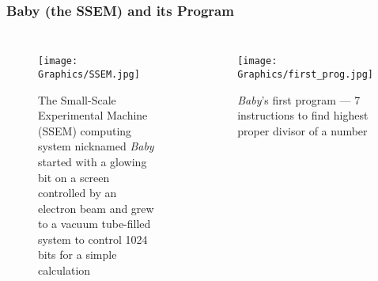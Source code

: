 \begin{frame}
  \frametitle{Baby (the SSEM) and its Program}
  \begin{columns}
    \begin{figure}
      \centering
      \texttt{[image: Graphics/SSEM.jpg]}
      \caption{The Small-Scale Experimental Machine (SSEM) computing system nicknamed \emph{Baby} started with a glowing bit on a screen controlled by an electron beam and grew to a vacuum tube-filled system to control \num{1024} bits for a simple calculation}
      \label{fig:Baby}
    \end{figure}

    \begin{figure}
      \centering
      \texttt{[image: Graphics/first\_prog.jpg]}
      \caption{\emph{Baby}'s first program --- 7 instructions to find highest proper divisor of a number}
      \label{fig:Baby-1st-program}
    \end{figure}  
  \end{columns}
\end{frame}
